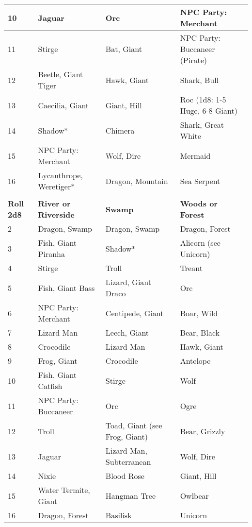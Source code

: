 \documentclass[a4paper,twoside,openany,10pt]{book}
\begin{document}
\begin{tabular*}{1\linewidth}{@{\extracolsep{\fill}}llll}
10 & Jaguar & Orc & NPC Party: Merchant \\\hline
11 & Stirge & Bat, Giant & NPC Party: Buccaneer (Pirate) \\\hline
12 & Beetle, Giant Tiger & Hawk, Giant & Shark, Bull \\\hline
13 & Caecilia, Giant & Giant, Hill & Roc (1d8: 1-5 Huge, 6-8 Giant) \\\hline
14 & Shadow* & Chimera & Shark, Great White \\\hline
15 & NPC Party: Merchant & Wolf, Dire & Mermaid \\\hline
16 & Lycanthrope, Weretiger* & Dragon, Mountain & Sea Serpent \\\hline
& & & \\\hline
\textbf{Roll 2d8} & \textbf{River or Riverside} & \textbf{Swamp} & \textbf{Woods or Forest} \\
2 & Dragon, Swamp & Dragon, Swamp & Dragon, Forest \\\hline
3 & Fish, Giant Piranha & Shadow* & Alicorn (see Unicorn) \\\hline
4 & Stirge & Troll & Treant \\\hline
5 & Fish, Giant Bass & Lizard, Giant Draco & Orc \\\hline
6 & NPC Party: Merchant & Centipede, Giant & Boar, Wild \\\hline
7 & Lizard Man & Leech, Giant & Bear, Black \\\hline
8 & Crocodile & Lizard Man & Hawk, Giant \\\hline
9 & Frog, Giant & Crocodile & Antelope \\\hline
10 & Fish, Giant Catfish & Stirge & Wolf \\\hline
11 & NPC Party: Buccaneer & Orc & Ogre \\\hline
12 & Troll & Toad, Giant (see Frog, Giant) & Bear, Grizzly \\\hline
13 & Jaguar & Lizard Man, Subterranean & Wolf, Dire \\\hline
14 & Nixie & Blood Rose & Giant, Hill \\\hline
15 & Water Termite, Giant & Hangman Tree & Owlbear \\\hline
16 & Dragon, Forest & Basilisk & Unicorn \\\bottomrule
\end{tabular*}\medskip

\pagebreak
\end{document}
